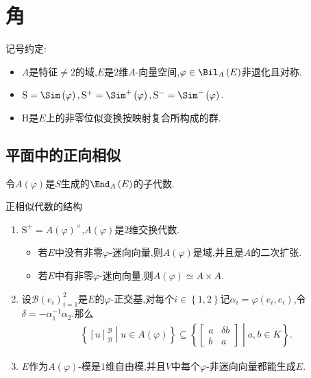 \chapter{角}

记号约定:
\begin{itemize}
	\item $A$是特征$\neq 2$的域,$E$是$2$维$A$-向量空间,$\varphi\in\Bil_{A}\left(E\right)$非退化且对称.
	\item $\mathrm{S}=\Sim\left(\varphi\right),\mathrm{S}^{+}=\Sim^{+}\left(\varphi\right),\mathrm{S}^{-}=\Sim^{-}\left(\varphi\right)$.
	\item $\mathrm{H}$是$E$上的非零位似变换按映射复合所构成的群.
\end{itemize}

\section{平面中的正向相似}

\begin{definition}{}{}
	令$A\left(\varphi\right)$是$S$生成的$\End_{A}\left(E\right)$的子代数.
\end{definition}

\begin{proposition}{正相似代数的结构}{}
	\begin{enumerate}
		\item $\mathrm{S}^{+}=A\left(\varphi\right)^{\times}$,$A\left(\varphi\right)$是$2$维交换代数.
		\begin{itemize}
			\item 若$E$中没有非零$\varphi$-迷向向量,则$A\left(\varphi\right)$是域,并且是$A$的二次扩张.
			\item 若$E$中有非零$\varphi$-迷向向量,则$A\left(\varphi\right)\simeq A\times A$.
		\end{itemize}
		\item 设$\mathcal{B}\left(e_{i}\right)_{i=1}^{2}$是$E$的$\varphi$-正交基,对每个$i\in\left\{1,2\right\}$记$\alpha_{i}=\varphi\left(e_{i},e_{i}\right)$,令$\delta=-\alpha_{1}^{-1}\alpha_{2}$.那么
		\begin{align*}
			\left\{\left[u\right]_{\mathcal{B}}^{\mathcal{B}}\middle|u\in A\left(\varphi\right)\right\}\subseteq
			\left\{
			\begin{bmatrix}
				a&\delta b\\
				b&a
			\end{bmatrix}
			\middle|a,b\in K
			\right\}.
		\end{align*}
		\item $E$作为$A\left(\varphi\right)$-模是$1$维自由模,并且$V$中每个$\varphi$-非迷向向量都能生成$E$.
	\end{enumerate}
\end{proposition}

